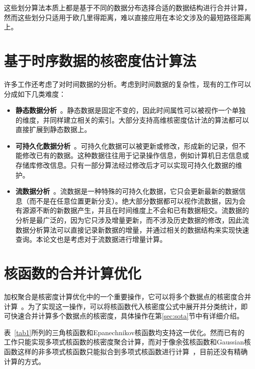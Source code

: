 这些划分算法本质上都是基于不同的数据分布选择合适的数据结构进行合并计算，然而这些划分只适用于欧几里得距离，难以直接应用在本论文涉及的最短路径距离上。

\section{基于时序数据的核密度估计算法}
\label{sec:2.2}

许多工作还考虑了对时间数据的分析。考虑到时间数据的复杂性，现有的工作可以分成如下几类难度：

\begin{itemize}[leftmargin=*]
	\item \textbf{静态数据分析}~\cite{patuelli2007network, mouratidis2006continuous}。静态数据是固定不变的，因此时间属性可以被视作一个单独的维度，并同样建立相关的索引。大部分支持高维核密度估计法的算法都可以直接扩展到静态数据上。
	
	\item \textbf{可持久化数据分析}~\cite{sasikala2014uncertain, cheng2012spatio}。可持久化数据可以被更新或修改，形成新的记录，但不能修改已有的数据。这种数据往往用于记录操作信息，例如计算机日志信息或存储库修改信息。只有一部分算法经过修改后才可以实现可持久化数据的维护。
	
	\item \textbf{流数据分析}~\cite{koudas2004approximate, figueiras2018real, li2021trace}。流数据是一种特殊的可持久化数据，它只会更新最新的数据信息（而不是在任意位置更新分支）。绝大部分数据都可以视作流数据，因为会有源源不断的新数据产生，并且在时间维度上不会和已有数据相交。流数据的分析是最广泛的，因为它只涉及增量更新，而不涉及历史数据的修改，因此流数据分析算法可以直接记录新数据的增量，并通过相关的数据结构来实现快速查询。本论文也是考虑对于流数据进行增量计算。
\end{itemize}

\section{核函数的合并计算优化}

	加权聚合是核密度计算优化中的一个重要操作，它可以将多个数据点的核密度合并计算~\cite{chan_fast_2021}。为了实现这一操作，可以将核函数代入核密度公式中展开并分类统计，即可快速合并计算多个数据点的核密度，具体操作在第\ref{sec:sota}节中有详细介绍。

	表~\ref{tab1}所列的三角核函数和Epanechnikov核函数均支持这一优化。然而已有的工作只能实现多项式核函数的核密度聚合计算，而对于像余弦核函数和Gaussian核函数这样的非多项式核函数只能拟合到多项式核函数进行计算~\cite{chan_karl_2019, chan_quad_2020}，目前还没有精确计算的方式。
	
